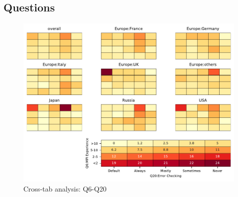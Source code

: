 
\subsection{Questions}


\begin{figure}
\begin{center}
\includegraphics[width=12cm]{../pdfs/Q6-Q20.pdf}
\caption{Cross-tab analysis: Q6-Q20}
\label{fig:Q6-Q20}
\end{center}
\end{figure}
